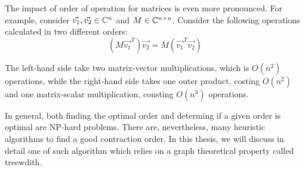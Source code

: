 The impact of order of operation for matrices is even more pronounced.
For example, consider $\vec{v_1}, \vec{v_2} \in \mathbb{C}^n $ and $M \in \mathbb{C}^{n \times n}$. 
Consider the following operations calculated in two different orders:
$$
(M\vec{v_1}^T ) \vec{v_2} = M(\vec{v_1}^T \vec{v_2})
$$

The left-hand side take two matrix-vector multiplications, which is $O(n^2)$ operations, while the right-hand side takes one outer product, costing $O(n^2)$ and one matrix-scalar multiplication, consting $O(n^3)$ operations.

In general, both finding the optimal order and determing if a given order is optimal are NP-hard problems.
There are, nevertheless, many heuristic algorithms to find a good contraction order.
In this thesis, we will discuss in detail one of such algorithm which relies on a graph theoretical property called treewdith.



